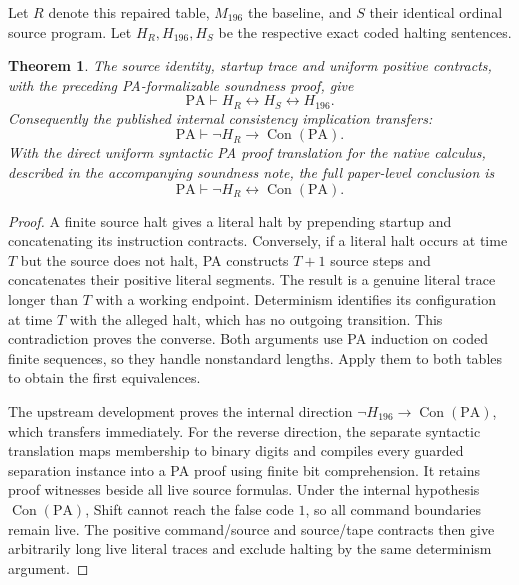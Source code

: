 \documentclass[11pt]{article}
\newtheorem{theorem}{Theorem}
\newcommand{\PA}{\mathrm{PA}}
\begin{document}
Let $R$ denote this repaired table, $M_{196}$ the baseline, and $S$
their identical ordinal source program.  Let $H_R,H_{196},H_S$ be
the respective exact coded halting sentences.

\begin{theorem}
The source identity, startup trace and uniform positive contracts,
with the preceding PA-formalizable soundness proof, give
\[
 \PA\vdash H_R\leftrightarrow H_S\leftrightarrow H_{196}.
\]
Consequently the published internal consistency implication transfers:
\[
 \PA\vdash\neg H_R\to\operatorname{Con}(\PA).
\]
With the direct uniform syntactic PA proof translation for the native
calculus, described in the accompanying soundness note, the full
paper-level conclusion is
\[
 \PA\vdash\neg H_R\leftrightarrow\operatorname{Con}(\PA).
\]
\end{theorem}
\begin{proof}
A finite source halt gives a literal halt by prepending startup and
concatenating its instruction contracts.  Conversely, if a literal
halt occurs at time $T$ but the source does not halt, PA constructs
$T+1$ source steps and concatenates their positive literal segments.
The result is a genuine literal trace longer than $T$ with a working
endpoint.  Determinism identifies its configuration at time $T$
with the alleged halt, which has no outgoing transition.  This
contradiction proves the converse.  Both arguments use PA induction
on coded finite sequences, so they handle nonstandard lengths.
Apply them to both tables to obtain the first equivalences.

The upstream development proves the internal direction
$\neg H_{196}\to\operatorname{Con}(\PA)$, which transfers immediately.
For the reverse direction, the separate syntactic translation maps
membership to binary digits and compiles every guarded separation
instance into a PA proof using finite bit comprehension.  It retains
proof witnesses beside all live source formulas.  Under the internal
hypothesis $\operatorname{Con}(\PA)$, Shift cannot reach the false
code $1$, so all command boundaries remain live.  The positive
command/source and source/tape contracts then give arbitrarily long
live literal traces and exclude halting by the same determinism
argument.
\end{proof}
\end{document}
